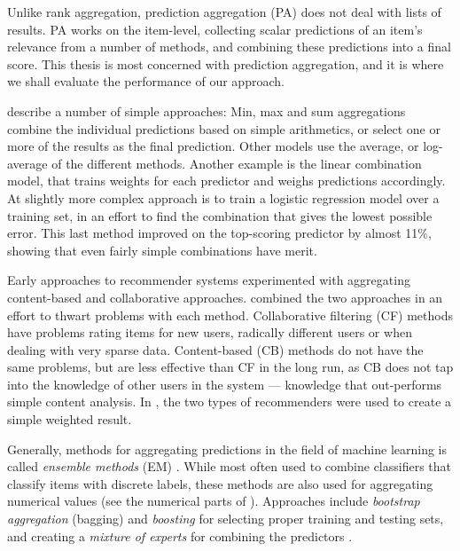 Unlike rank aggregation, prediction aggregation (PA) does not deal with lists of results.
PA works on the item-level, collecting scalar predictions of an item's relevance from a number of methods,
and combining these predictions into a final score.
This thesis is most concerned with prediction aggregation,
and it is where we shall evaluate the performance of our approach.

\cite{Aslam2001} describe a number of simple approaches:
Min, max and sum aggregations combine the individual predictions based on simple arithmetics, 
or select one or more of the results as the final prediction. 
Other models use the average, or log-average of the different methods.
Another example is the linear combination model, that trains weights for each predictor and weighs predictions accordingly.
At slightly more complex approach is to train a logistic regression model \cite[p3]{Aslam2001}
over a training set, in an effort to find the combination that gives the lowest possible error.
This last method improved on the top-scoring predictor by almost 11\%,
showing that even fairly simple combinations have merit.

Early approaches to recommender systems experimented with aggregating content-based and collaborative approaches.
\cite{Claypool1999} combined the two approaches in an effort to thwart problems with each method.
Collaborative filtering (CF) methods have problems rating items for new users, radically different users or when dealing with very sparse data.
Content-based (CB) methods do not have the same problems, but are less effective than CF in the long run, as CB does not tap into the 
knowledge of other users in the system --- knowledge that out-performs simple content analysis.
In \cite{Claypool1999}, the two types of recommenders were used to create a simple weighted result.

Generally, methods for aggregating predictions in the field of machine learning is called \emph{ensemble methods} (EM) \cite{Dietterich2000}.
While most often used to combine classifiers that classify items with discrete labels,
these methods are also used for aggregating numerical values (see the numerical parts of \cite{Breiman1996}).
Approaches include \emph{bootstrap aggregation} (bagging) and \emph{boosting} 
for selecting proper training and testing sets,
and creating a \emph{mixture of experts} for combining the predictors
\cite[p27]{Polikar2006}.


